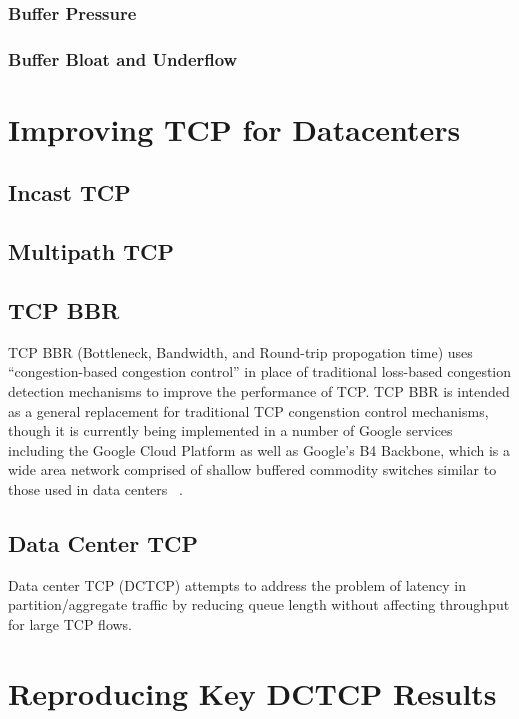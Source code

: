 \subsubsection{Buffer Pressure}

\subsubsection{Buffer Bloat and Underflow}

\section{Improving TCP for Datacenters}

\subsection{Incast TCP}

\subsection{Multipath TCP}

\subsection{TCP BBR}

TCP BBR (Bottleneck, Bandwidth, and Round-trip propogation time) uses ``congestion-based congestion control'' in place of traditional loss-based congestion detection mechanisms to improve the performance of TCP. TCP BBR is intended as a general replacement for traditional TCP congenstion control mechanisms, though it is currently being implemented in a number of Google services including the Google Cloud Platform as well as Google's B4 Backbone, which is a wide area network comprised of shallow buffered commodity switches similar to those used in data centers ~\cite{cardwell_bbr:_2016}.  

\subsection{Data Center TCP}

Data center TCP (DCTCP) attempts to address the problem of latency in partition/aggregate traffic by reducing queue length without affecting throughput for large TCP flows.

\section{Reproducing Key DCTCP Results}

